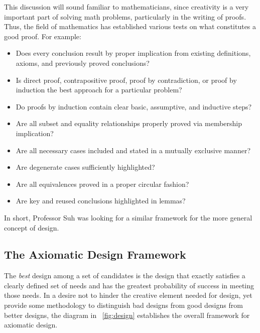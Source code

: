 This discussion will sound familiar to mathematicians, since creativity is a very important part of solving math
problems, particularly in the writing of proofs.  Thus, the field of mathematics has established various tests on
what constitutes a good proof.  For example:
\begin{itemize}
\item Does every conclusion result by proper implication from existing definitions, axioms, and previously proved
  conclusions?
\item Is direct proof, contrapositive proof, proof by contradiction, or proof by induction the best approach for a
  particular problem?
\item Do proofs by induction contain clear basic, assumptive, and inductive steps?
\item Are all subset and equality relationships properly proved via membership implication?
\item Are all necessary cases included and stated in a mutually exclusive manner?
\item Are degenerate cases sufficiently highlighted?
\item Are all equivalences proved in a proper circular fashion?
\item Are key and reused conclusions highlighted in lemmas?
\end{itemize}
In short, Professor Suh was looking for a similar framework for the more general concept of design.

\subsection{The Axiomatic Design Framework}\label{sec:sub:framework}

The \emph{best} design among a set of candidates is the design that exactly satisfies a clearly defined set of
needs and has the greatest probability of success in meeting those needs.  In a desire not to hinder the creative
element needed for design, yet provide some methodology to distinguish bad designs from good designs from better
designs, the diagram in \figurename~\ref{fig:design} establishes the overall framework for axiomatic design.

